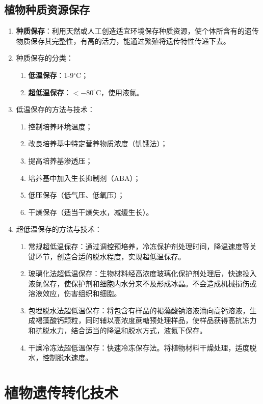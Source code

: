\subsection{植物种质资源保存}
\begin{enumerate}
    \item \textbf{种质保存}：利用天然或人工创造适宜环境保存种质资源，使个体所含有的遗传物质保存其完整性，有高的活力，能通过繁殖将遗传特性传递下去。
    \item 种质保存的分类：
    \begin{enumerate}
        \item \textbf{低温保存}：1-9$^\circ$C；
        \item \textbf{超低温保存}：$<-80^\circ$C，使用液氮。
    \end{enumerate}
    \item 低温保存的方法与技术：
    \begin{enumerate}
        \item 控制培养环境温度；
        \item 改良培养基中特定营养物质浓度（饥饿法）；
        \item 提高培养基渗透压；
        \item 培养基中加入生长抑制剂（ABA）；
        \item 低压保存（低气压、低氧压）；
        \item 干燥保存（适当干燥失水，减缓生长）。
    \end{enumerate}
    \item 超低温保存的方法与技术：
    \begin{enumerate}
        \item 常规超低温保存：通过调控预培养，冷冻保护剂处理时间，降温速度等关键环节，创造合适的脱水程度，实现超低温保存。
        \item 玻璃化法超低温保存：生物材料经高浓度玻璃化保护剂处理后，快速投入液氮保存，使保护剂和细胞内水分来不及形成冰晶。不会造成机械损伤或溶液效应，伤害组织和细胞。
        \item 包埋脱水法超低温保存：将包含有样品的褐藻酸钠溶液滴向高钙溶液，生成褐藻酸钙颗粒，同时辅以高浓度蔗糖预处理样品，使样品获得高抗冻力和抗脱水力，结合适当的降温和脱水方式，液氮下保存。
        \item 干燥冷冻法超低温保存：快速冷冻保存法。将植物材料干燥处理，适度脱水，控制脱水速度。
    \end{enumerate}
\end{enumerate}

\section{植物遗传转化技术}
